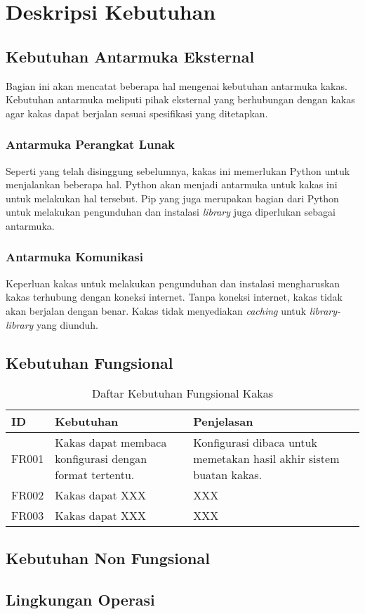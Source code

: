 \section{Deskripsi Kebutuhan}

\subsection{Kebutuhan Antarmuka Eksternal}

Bagian ini akan mencatat beberapa hal mengenai kebutuhan antarmuka kakas.
Kebutuhan antarmuka meliputi pihak eksternal yang berhubungan dengan kakas agar kakas dapat berjalan sesuai spesifikasi yang ditetapkan.

\subsubsection{Antarmuka Perangkat Lunak}

Seperti yang telah disinggung sebelumnya, kakas ini memerlukan Python untuk menjalankan beberapa hal.
Python akan menjadi antarmuka untuk kakas ini untuk melakukan hal tersebut.
Pip yang juga merupakan bagian dari Python untuk melakukan pengunduhan dan instalasi \textit{library} juga diperlukan sebagai antarmuka. 

\subsubsection{Antarmuka Komunikasi}

Keperluan kakas untuk melakukan pengunduhan dan instalasi mengharuskan kakas terhubung dengan koneksi internet.
Tanpa koneksi internet, kakas tidak akan berjalan dengan benar.
Kakas tidak menyediakan \textit{caching} untuk \textit{library-library} yang diunduh.

\subsection{Kebutuhan Fungsional}

\begin{table}
    \small
    \caption{Daftar Kebutuhan Fungsional Kakas}\label{table:functional-req}
    \begin{center}
        \begin{tabular}{|p{0.1\linewidth} | p{0.4\linewidth} | p{0.5\linewidth}|} 
            \hline
            \textbf{ID} & \textbf{Kebutuhan} & \textbf{Penjelasan}\\ [0.5ex] 
            \hline
            FR001 & Kakas dapat membaca konfigurasi dengan format tertentu. & Konfigurasi dibaca untuk memetakan hasil akhir sistem buatan kakas. \\ 
            \hline
            FR002 & Kakas dapat XXX & XXX \\ 
            \hline
            FR003 & Kakas dapat XXX & XXX \\ 
            \hline
        \end{tabular}
    \end{center}
\end{table}

\subsection{Kebutuhan Non Fungsional}

\subsection{Lingkungan Operasi}


